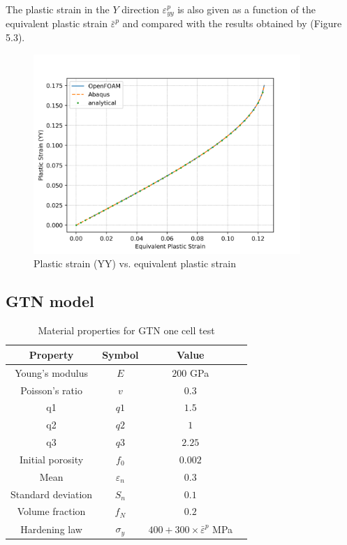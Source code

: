 \documentclass[sn-mathphys,Numbered,draft]{sn-jnl}%
\begin{document}
\begin{appendices}
The plastic strain in the $Y$ direction $\varepsilon^p_{yy}$ is also given as a function of the equivalent plastic strain ${\bar{\varepsilon}}^p$ and compared with the results obtained by \citet{doghri_numerical_1995} (Figure 5.3).

\begin{figure}[htb]
\begin{center}
	\includegraphics[width=0.9\textwidth]{./figures/finiteVolumeImplementation/plasticStrainMult.png}
\caption{Plastic strain (YY) vs. equivalent plastic strain}
\label{fig:EqStrain_EqStress}
\end{center}
\end{figure}
\FloatBarrier


\subsection{GTN model}

\begin{table}[htb]
	\centering
		\begin{tabular}{cccc} \hline
			Property & Symbol & Value  \\ \hline 
			Young's modulus & $E$ & $200$ GPa \\
			Poisson's ratio & $v$ & $0.3$   \\
			q1 & $q1$ & $1.5$  \\
		    q2 & $q2$ & $1$  \\
		    q3 & $q3$ & $2.25$  \\
		    Initial porosity & $f_0$ & $0.002$  \\
		    Mean & $\varepsilon_n$ & $0.3$  \\
		    Standard deviation & $S_n$ & $0.1$  \\
		    Volume fraction & $f_N$ & $0.2$  \\
			Hardening law & $\sigma_y$ & $400+300\times{\bar{\varepsilon}}^p$ MPa  \\
			\hline
		\end{tabular}
	\caption{Material properties for GTN one cell test}
	\label{tab:material_properties}
\end{table}


\end{appendices}
\end{document}
